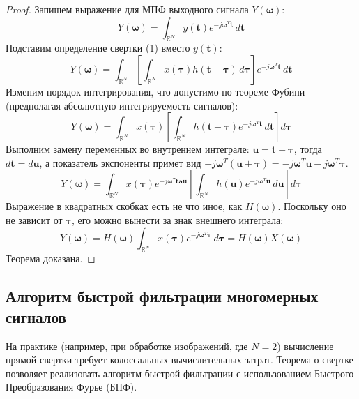 \documentclass[12pt,a4paper]{article}
\newcommand{\vect}[1]{\mathbf{#1}}
\begin{document}
\begin{proof}
Запишем выражение для МПФ выходного сигнала $Y(\vect{\omega})$:
$$ Y(\vect{\omega}) = \int_{\mathbb{R}^N} y(\vect{t}) e^{-j \vect{\omega}^T \vect{t}} \, d\vect{t} $$
Подставим определение свертки (1) вместо $y(\vect{t})$:
$$ Y(\vect{\omega}) = \int_{\mathbb{R}^N} \left[ \int_{\mathbb{R}^N} x(\vect{\tau}) h(\vect{t} - \vect{\tau}) \, d\vect{\tau} \right] e^{-j \vect{\omega}^T \vect{t}} \, d\vect{t} $$
Изменим порядок интегрирования, что допустимо по теореме Фубини (предполагая абсолютную интегрируемость сигналов):
$$ Y(\vect{\omega}) = \int_{\mathbb{R}^N} x(\vect{\tau}) \left[ \int_{\mathbb{R}^N} h(\vect{t} - \vect{\tau}) e^{-j \vect{\omega}^T \vect{t}} \, d\vect{t} \right] d\vect{\tau} $$
Выполним замену переменных во внутреннем интеграле: $\vect{u} = \vect{t} - \vect{\tau}$, тогда $d\vect{t} = d\vect{u}$, а показатель экспоненты примет вид $-j \vect{\omega}^T (\vect{u} + \vect{\tau}) = -j \vect{\omega}^T \vect{u} - j \vect{\omega}^T \vect{\tau}$.
$$ Y(\vect{\omega}) = \int_{\mathbb{R}^N} x(\vect{\tau}) e^{-j \vect{\omega}^T \vect{tau}} \left[ \int_{\mathbb{R}^N} h(\vect{u}) e^{-j \vect{\omega}^T \vect{u}} \, d\vect{u} \right] d\vect{\tau} $$
Выражение в квадратных скобках есть не что иное, как $H(\vect{\omega})$. Поскольку оно не зависит от $\vect{\tau}$, его можно вынести за знак внешнего интеграла:
$$ Y(\vect{\omega}) = H(\vect{\omega}) \int_{\mathbb{R}^N} x(\vect{\tau}) e^{-j \vect{\omega}^T \vect{\tau}} \, d\vect{\tau} = H(\vect{\omega}) X(\vect{\omega}) $$
Теорема доказана.
\end{proof}

\subsection{Алгоритм быстрой фильтрации многомерных сигналов}

На практике (например, при обработке изображений, где $N=2$) вычисление прямой свертки требует колоссальных вычислительных затрат. Теорема о свертке позволяет реализовать алгоритм быстрой фильтрации с использованием Быстрого Преобразования Фурье (БПФ).
\end{document}
